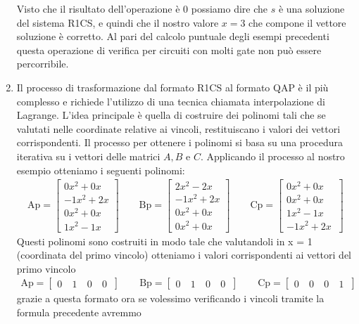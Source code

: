 \begin{enumerate}
    Visto che il risultato dell'operazione è 0 possiamo dire che $s$ è una soluzione del sistema R1CS, e quindi che il
    nostro valore $x=3$ che compone il vettore soluzione è corretto. Al pari del calcolo puntuale degli esempi
    precedenti questa operazione di verifica per circuiti con molti gate non può essere percorribile.

    \item  Il processo di trasformazione dal formato R1CS al formato QAP è il più complesso e richiede l'utilizzo di una
    tecnica chiamata interpolazione di Lagrange. L'idea principale è quella di costruire dei polinomi tali che se
    valutati nelle coordinate relative ai vincoli, restituiscano i valori dei vettori corrispondenti. Il processo per
    ottenere i polinomi si basa su una procedura iterativa su i vettori delle matrici $A,B$ e $C$. 
    Applicando il processo al nostro esempio otteniamo i seguenti polinomi:
    \begin{gather*}
        \text{Ap} =
        \begin{bmatrix}
        0x^2+0x \\
        -1x^2+2x \\
        0x^2+0x \\
        1x^2-1x \
        \end{bmatrix}
        \qquad
        \text{Bp} =
        \begin{bmatrix}
        2x^2-2x \\
        -1x^2+2x \\
        0x^2+0x \\
        0x^2+0x \
        \end{bmatrix}
        \qquad
        \text{Cp} =
        \begin{bmatrix}
        0x^2+0x \\
        0x^2+0x \\
        1x^2-1x \\
        -1x^2+2x \
        \end{bmatrix}
    \end{gather*}    
    Questi polinomi sono costruiti in modo tale che valutandoli in x = 1 (coordinata del primo vincolo) otteniamo i valori corrispondenti ai vettori del
    primo vincolo
    \begin{gather*}
        \text{Ap} =
        \begin{bmatrix}
        0&\
        1&\
        0&\
        0\
        \end{bmatrix}
        \qquad
        \text{Bp} =
        \begin{bmatrix}
        0&\
        1&\
        0&\
        0\
        \end{bmatrix}
        \qquad
        \text{Cp} =
        \begin{bmatrix}
        0&\
        0&\
        0&\
        1\
        \end{bmatrix}
    \end{gather*}
    grazie a questa formato ora se volessimo verificando i vincoli tramite la formula precedente avremmo
    

\end{enumerate}
